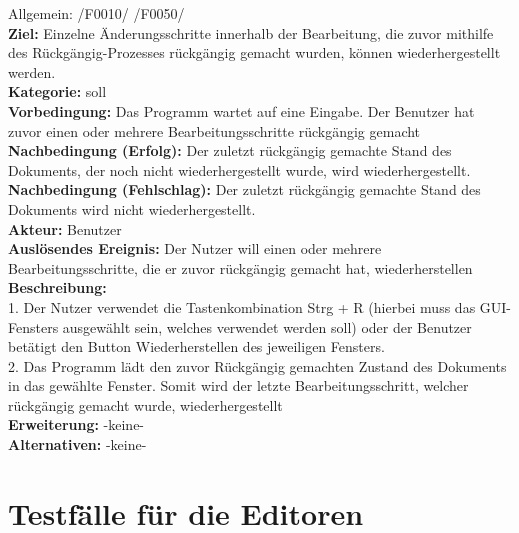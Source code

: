 \documentclass[a4paper]{scrreprt}
\begin{document}
Allgemein: /F0010/ /F0050/ \\
\textbf{Ziel:} Einzelne Änderungsschritte innerhalb der Bearbeitung, die zuvor mithilfe des Rückgängig-Prozesses rückgängig gemacht wurden, können wiederhergestellt werden.\\
\textbf{Kategorie:} soll\\
\textbf{Vorbedingung:} Das Programm wartet auf eine Eingabe. Der Benutzer hat zuvor einen oder mehrere Bearbeitungsschritte rückgängig gemacht\\
\textbf{Nachbedingung (Erfolg):} Der zuletzt rückgängig gemachte Stand des Dokuments, der noch nicht wiederhergestellt wurde, wird wiederhergestellt.
\textbf{Nachbedingung (Fehlschlag):} Der zuletzt rückgängig gemachte Stand des Dokuments wird nicht wiederhergestellt.\\
\textbf{Akteur:} Benutzer\\
\textbf{Auslösendes Ereignis:} Der Nutzer will einen oder mehrere Bearbeitungsschritte, die er zuvor rückgängig gemacht hat, wiederherstellen\\
\textbf{Beschreibung:} \\
1. Der Nutzer verwendet die Tastenkombination Strg + R (hierbei muss das GUI-Fensters ausgewählt sein, welches verwendet werden soll) oder der Benutzer betätigt den Button Wiederherstellen des jeweiligen Fensters.\\
2. Das Programm lädt den zuvor Rückgängig gemachten Zustand des Dokuments in das gewählte Fenster. Somit wird der letzte Bearbeitungsschritt, welcher rückgängig gemacht wurde, wiederhergestellt \\
\textbf {Erweiterung:} -keine- \\
\textbf {Alternativen:} -keine- \\

\section{Testfälle für die Editoren}
\end{document}

